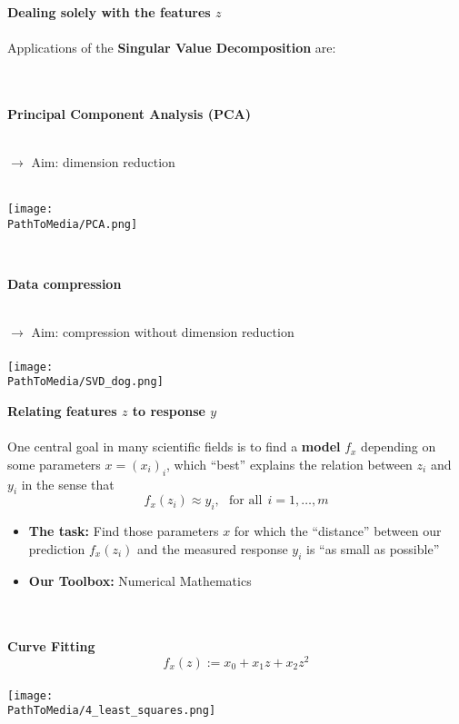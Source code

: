 \begin{frame}
	\textbf{\large \color{header} Dealing solely with the features $z$}~~\\~\\
	Applications of the \textbf{Singular Value Decomposition} are:\\
	~\\~\\
	\begin{minipage}[t]{0.48\textwidth}
		\textbf{Principal Component Analysis (PCA)}\\~\\
		{\raggedright
			$\rightarrow$ Aim: dimension reduction\\~\\}
		{\centering\texttt{[image: \\PathToMedia/PCA.png]}}
	\end{minipage}
	~~~~~
	\begin{minipage}[t]{0.48\textwidth}
		\textbf{Data compression}\\~\\
		\raggedright
		$\rightarrow$ Aim: compression without dimension reduction\\~\\
		{ \hspace*{-0.6cm}\centering\texttt{[image: \\PathToMedia/SVD\_dog.png]}}
	\end{minipage}
\end{frame}
%
\begin{frame}
	\textbf{\large \color{header} Relating features $z$ to response $y$}~\\~\\
	One central goal in many scientific fields is to find a \textbf{model} $f_x$ depending on some parameters $x=(x_i)_i$, which ``best'' explains the relation between $z_i$ and $y_i$ in the sense that 
	$$f_x(z_i) \approx y_i,~~~\text{for all}~~i=1,\ldots,m$$
	\begin{itemize}
		\item  \textbf{The task:} Find those parameters $x$ for which the ``distance'' between our prediction  $f_x(z_i)$ and the measured response $y_i$ is ``as small as possible''\\
		\item \textbf{Our Toolbox:} Numerical Mathematics
		~\\
	\end{itemize}
	~\\~\\
	\textbf{Curve Fitting}\\
	 \centering	
		$$f_x(z) := x_0 + x_1z + x_2 z^2$$
		\\ \centering
		\texttt{[image: \\PathToMedia/4\_least\_squares.png]}\\
\end{frame}

